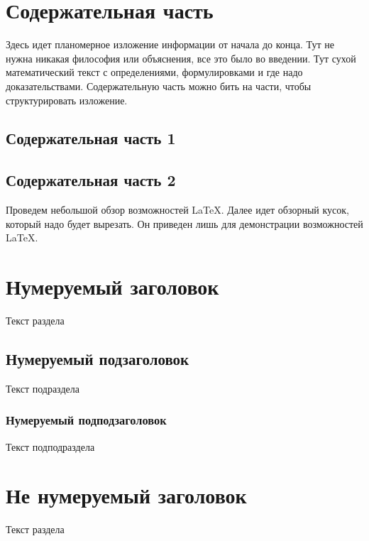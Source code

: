 \documentclass{article}
\begin{document}
\section{Содержательная часть}

Здесь идет планомерное изложение информации от начала до конца. Тут не нужна никакая философия или объяснения, все это было во введении. Тут сухой математический текст с определениями, формулировками и где надо доказательствами. Содержательную часть можно бить на части, чтобы структурировать изложение.

\subsection{Содержательная часть 1}

\subsection{Содержательная часть 2}






\appendix

Проведем небольшой обзор возможностей \LaTeX. Далее идет обзорный кусок, который надо будет вырезать. Он приведен лишь для демонстрации возможностей \LaTeX.

\section{Нумеруемый заголовок}
Текст раздела
\subsection{Нумеруемый подзаголовок}
Текст подраздела
\subsubsection{Нумеруемый подподзаголовок}
Текст подподраздела

\section*{Не нумеруемый заголовок}
Текст раздела
\end{document}
